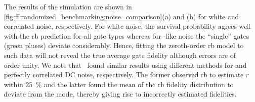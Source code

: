 The results of the simulation are shown in \cref{fig:ff:randomized_benchmarking:noise_comparison}(a) and (b) for white and correlated noise, respectively.
For white noise, the survival probability agrees well with the \gls{rb} prediction for all gate types whereas for \oneoverf-like noise the \enquote{single} gates (green pluses) deviate considerably.
Hence, fitting the zeroth-order \gls{rb} model to such data will not reveal the true average gate fidelity although errors are of order unity.
We note that~ found similar results using different methods for \oneoverf and perfectly correlated DC noise, respectively.
The former observed \gls{rb} to estimate $r$ within \qty{25}{\percent} and the latter found the mean of the \gls{rb} fidelity distribution to deviate from the mode, thereby giving rise to incorrectly estimated fidelities.

